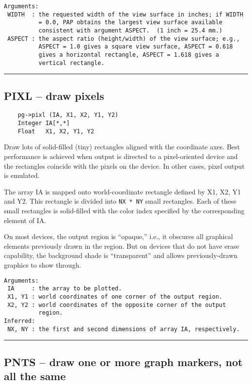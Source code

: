\begin{verbatim}
Arguments:
 WIDTH  : the requested width of the view surface in inches; if WIDTH
          = 0.0, PAP obtains the largest view surface available
          consistent with argument ASPECT.  (1 inch = 25.4 mm.) 
 ASPECT : the aspect ratio (height/width) of the view surface; e.g.,
          ASPECT = 1.0 gives a square view surface, ASPECT = 0.618
          gives a horizontal rectangle, ASPECT = 1.618 gives a
          vertical rectangle. 
\end{verbatim}

\hrule

\subsection*{PIXL -- draw pixels }

\begin{verbatim}
    pg->pixl (IA, X1, X2, Y1, Y2)
    Integer IA[*,*]
    Float   X1, X2, Y1, Y2
\end{verbatim}

Draw lots of solid-filled (tiny) rectangles aligned with the
coordinate axes.  Best performance is achieved when output is directed
to a pixel-oriented device and the rectangles coincide with the pixels
on the device.  In other cases, pixel output is emulated.

The array IA is mapped onto world-coordinate rectangle defined by X1,
X2, Y1 and Y2.  This rectangle is divided into {\tt NX * NY} small
rectangles.  Each of these small rectangles is solid-filled with the
color index specified by the corresponding element of IA.

On most devices, the output region is ``opaque,'' i.e., it obscures
all graphical elements previously drawn in the region.  But on devices
that do not have erase capability, the background shade is
``transparent'' and allows previously-drawn graphics to show through.

\begin{verbatim}
Arguments:
 IA     : the array to be plotted.
 X1, Y1 : world coordinates of one corner of the output region.
 X2, Y2 : world coordinates of the opposite corner of the output
          region. 
Inferred:
 NX, NY : the first and second dimensions of array IA, respectively. 
\end{verbatim}

\hrule

\subsection*{PNTS -- draw one or more graph markers, not all the same }

